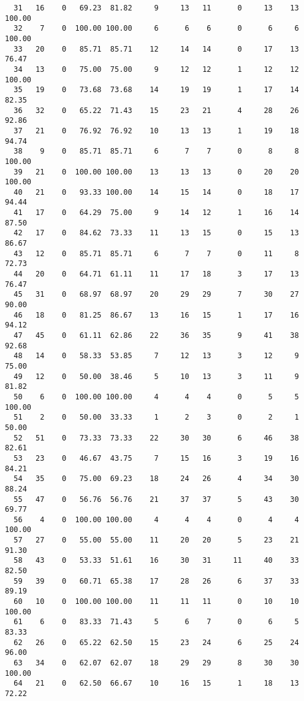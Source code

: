 \begin{verbatim}
  31   16    0   69.23  81.82     9     13   11      0     13    13   100.00
  32    7    0  100.00 100.00     6      6    6      0      6     6   100.00
  33   20    0   85.71  85.71    12     14   14      0     17    13    76.47
  34   13    0   75.00  75.00     9     12   12      1     12    12   100.00
  35   19    0   73.68  73.68    14     19   19      1     17    14    82.35
  36   32    0   65.22  71.43    15     23   21      4     28    26    92.86
  37   21    0   76.92  76.92    10     13   13      1     19    18    94.74
  38    9    0   85.71  85.71     6      7    7      0      8     8   100.00
  39   21    0  100.00 100.00    13     13   13      0     20    20   100.00
  40   21    0   93.33 100.00    14     15   14      0     18    17    94.44
  41   17    0   64.29  75.00     9     14   12      1     16    14    87.50
  42   17    0   84.62  73.33    11     13   15      0     15    13    86.67
  43   12    0   85.71  85.71     6      7    7      0     11     8    72.73
  44   20    0   64.71  61.11    11     17   18      3     17    13    76.47
  45   31    0   68.97  68.97    20     29   29      7     30    27    90.00
  46   18    0   81.25  86.67    13     16   15      1     17    16    94.12
  47   45    0   61.11  62.86    22     36   35      9     41    38    92.68
  48   14    0   58.33  53.85     7     12   13      3     12     9    75.00
  49   12    0   50.00  38.46     5     10   13      3     11     9    81.82
  50    6    0  100.00 100.00     4      4    4      0      5     5   100.00
  51    2    0   50.00  33.33     1      2    3      0      2     1    50.00
  52   51    0   73.33  73.33    22     30   30      6     46    38    82.61
  53   23    0   46.67  43.75     7     15   16      3     19    16    84.21
  54   35    0   75.00  69.23    18     24   26      4     34    30    88.24
  55   47    0   56.76  56.76    21     37   37      5     43    30    69.77
  56    4    0  100.00 100.00     4      4    4      0      4     4   100.00
  57   27    0   55.00  55.00    11     20   20      5     23    21    91.30
  58   43    0   53.33  51.61    16     30   31     11     40    33    82.50
  59   39    0   60.71  65.38    17     28   26      6     37    33    89.19
  60   10    0  100.00 100.00    11     11   11      0     10    10   100.00
  61    6    0   83.33  71.43     5      6    7      0      6     5    83.33
  62   26    0   65.22  62.50    15     23   24      6     25    24    96.00
  63   34    0   62.07  62.07    18     29   29      8     30    30   100.00
  64   21    0   62.50  66.67    10     16   15      1     18    13    72.22

\end{verbatim}

